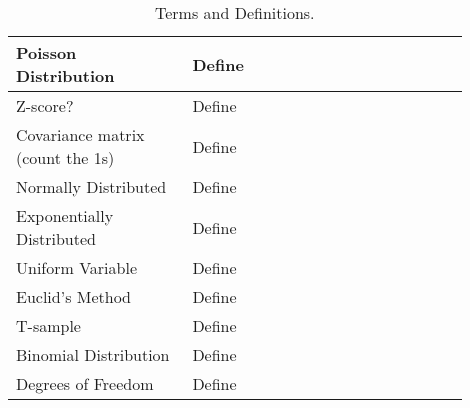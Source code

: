 \begin{table}[htbp]
\begin{tabular}{|p{0.35\linewidth}|p{0.55\linewidth}|}
Poisson Distribution         & Define                       \\ \hline
Z-score?        & Define                       \\ \hline
Covariance matrix (count the 1s)         & Define                       \\ \hline
Normally Distributed         & Define                       \\ \hline
Exponentially Distributed         & Define                       \\ \hline
Uniform Variable         & Define                       \\ \hline
Euclid's Method         & Define                       \\ \hline
T-sample         & Define                       \\ \hline
Binomial Distribution         & Define                       \\ \hline
Degrees of Freedom         & Define                       \\ \hline

\end{tabular}
\caption{Terms and Definitions.}
\label{table}
\end{table}
